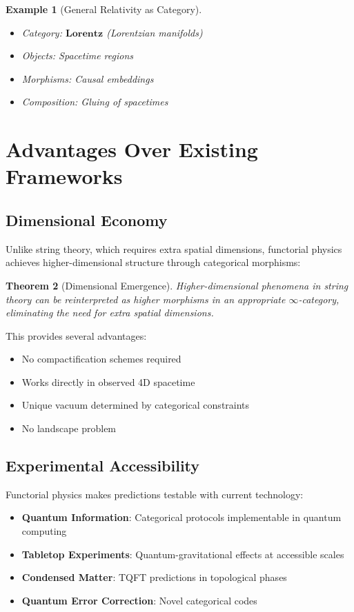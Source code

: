 \documentclass[11pt,a4paper]{article}
\newtheorem{theorem}{Theorem}
\newtheorem{example}[theorem]{Example}
\begin{document}
\begin{example}[General Relativity as Category]
\begin{itemize}
    \item Category: $\mathbf{Lorentz}$ (Lorentzian manifolds)
    \item Objects: Spacetime regions
    \item Morphisms: Causal embeddings
    \item Composition: Gluing of spacetimes
\end{itemize}
\end{example}

\section{Advantages Over Existing Frameworks}

\subsection{Dimensional Economy}

Unlike string theory, which requires extra spatial dimensions, functorial physics achieves higher-dimensional structure through categorical morphisms:

\begin{theorem}[Dimensional Emergence]
Higher-dimensional phenomena in string theory can be reinterpreted as higher morphisms in an appropriate $\infty$-category, eliminating the need for extra spatial dimensions.
\end{theorem}

This provides several advantages:
\begin{itemize}
    \item No compactification schemes required
    \item Works directly in observed 4D spacetime
    \item Unique vacuum determined by categorical constraints
    \item No landscape problem
\end{itemize}

\subsection{Experimental Accessibility}

Functorial physics makes predictions testable with current technology:

\begin{itemize}
    \item \textbf{Quantum Information}: Categorical protocols implementable in quantum computing
    \item \textbf{Tabletop Experiments}: Quantum-gravitational effects at accessible scales
    \item \textbf{Condensed Matter}: TQFT predictions in topological phases
    \item \textbf{Quantum Error Correction}: Novel categorical codes
\end{itemize}
\end{document}
